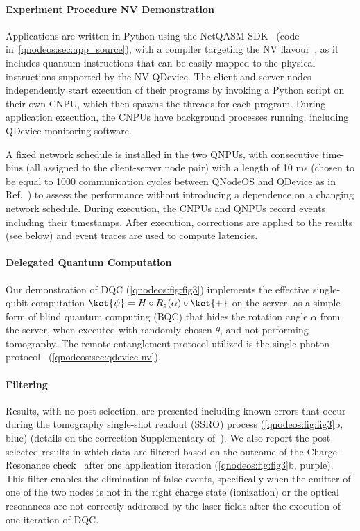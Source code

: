 \paragraph{Experiment Procedure NV Demonstration}

Applications are written in Python using the NetQASM SDK~\cite{dahlberg_2022_netqasm} (code in~\cref{qnodeos:sec:app_source}), with a compiler targeting the NV flavour~\cite{dahlberg_2022_netqasm}, as it includes quantum instructions that can be easily mapped to the physical instructions supported by the NV QDevice. The client and server nodes independently start execution of their programs by invoking a Python script on their own CNPU, which then spawns the threads for each program. During application execution, the CNPUs have background processes running, including QDevice monitoring software.

A fixed network schedule is installed in the two QNPUs, with consecutive time-bins (all assigned to the client-server node pair) with a length of 10 ms (chosen to be equal to 1000 communication cycles between QNodeOS and QDevice as in Ref.~\cite{pompili_2022_experimental}) to assess the performance without introducing a dependence on a changing network schedule.  During execution, the CNPUs and QNPUs record events including their timestamps. After execution, corrections are applied to the results (see below) and event traces are used to compute latencies.

\paragraph{Delegated Quantum Computation}

Our demonstration of DQC (\cref{qnodeos:fig:fig3}) implements the effective single-qubit computation $\ket{\psi} = H \circ R_z(\alpha) \circ \ket{+}$ on the server, as a simple form of blind quantum computing (BQC) that hides the rotation angle $\alpha$ from the server, when executed with randomly chosen $\theta$, and not performing tomography. The remote entanglement protocol utilized is the single-photon protocol~\cite{cabrillo1999creation,bose1999proposal,hermans2023entangling} (\cref{qnodeos:sec:qdevice-nv}).

\paragraph{Filtering}

Results, with no post-selection, are presented including known errors that occur during the tomography single-shot readout (SSRO) process (\cref{qnodeos:fig:fig3}b, blue) (details on the correction Supplementary of~\cite{pompili_2021_multinode}). We also report the post-selected results in which data are filtered based on the outcome of the Charge-Resonance check~\cite{robledo2010control} after one application iteration (\cref{qnodeos:fig:fig3}b, purple). This filter enables the elimination of false events, specifically when the emitter of one of the two nodes is not in the right charge state (ionization) or the optical resonances are not correctly addressed by the laser fields after the execution of one iteration of DQC.

